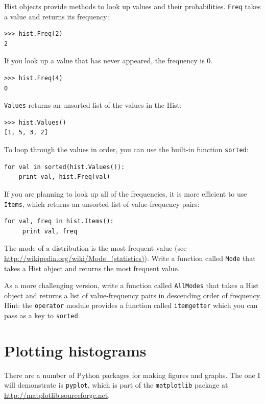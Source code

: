 \documentclass[12pt]{book}
\begin{document}
Hist objects provide methods to look up values and their
probabilities.  {\tt Freq} takes a value and returns its frequency:
%
\begin{verbatim}
>>> hist.Freq(2)
2
\end{verbatim}

If you look up a value that has never appeared, the frequency is 0.
%
\begin{verbatim}
>>> hist.Freq(4)
0
\end{verbatim}

{\tt Values} returns an unsorted list of the values in the Hist:
%
\begin{verbatim}
>>> hist.Values()
[1, 5, 3, 2]
\end{verbatim}

To loop through the values in order, you can use the built-in function
{\tt sorted}:
%
\begin{verbatim}
for val in sorted(hist.Values()):
    print val, hist.Freq(val)
\end{verbatim}

If you are planning to look up all of the frequencies, it is more
efficient to use {\tt Items}, which returns an unsorted list of
value-frequency pairs:
%
\begin{verbatim}
for val, freq in hist.Items():
     print val, freq
\end{verbatim}

\begin{exercise}
The mode of a distribution is the most frequent value (see
\url{http://wikipedia.org/wiki/Mode_(statistics)}).  Write a function called
    {\tt Mode} that takes a Hist object and returns the most frequent
    value.

As a more challenging version, write a function called {\tt AllModes}
that takes a Hist object and returns a list of value-frequency
pairs in descending order of frequency.  Hint: the {\tt operator}
module provides a function called {\tt itemgetter} which you can
pass as a key to {\tt sorted}.

\end{exercise}


\section{Plotting histograms}

There are a number of Python packages for making figures and graphs.
The one I will demonstrate is {\tt pyplot}, which is part of
the {\tt matplotlib} package at \url{http://matplotlib.sourceforge.net}.
\end{document}
